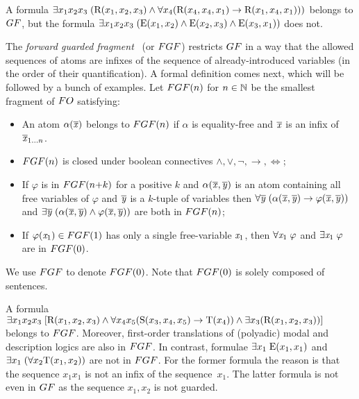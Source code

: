 \begin{example}
A formula $\exists{x_{1}x_{2}x_{3}}\; (\mathrm{R}(x_{1}, x_{2}, x_{3}) \land \forall x_{4}(\mathrm{R}(x_{4}, x_{4}, x_{1}) \to \mathrm{R}(x_{1}, x_{4}, x_{1})))$ belongs to $\GF$, but the formula $\exists{x_{1}x_{2}x_{3}}\; (\mathrm{E}(x_{1}, x_{2}) \land \mathrm{E}(x_{2}, x_{3}) \land \mathrm{E}(x_{3}, x_{1}))$ does not.
\end{example}

The \emph{forward guarded fragment}~\cite[Sec. 3.1]{Bednarczyk21} (or $\FGF$) restricts $\GF$ in a way that the allowed sequences of atoms are infixes of the sequence of already-introduced variables (in the order of their quantification).
A formal definition comes next, which will be followed by a bunch of examples.
Let $\FGF(n)$ for $n \in {\mathbb{N}}$ be the smallest fragment of $\FO$ satisfying:
\begin{itemize}\itemsep0em
    \item An atom $\alpha(\overline{\mathit{x}})$ belongs to $\FGF(n)$ if $\alpha$ is equality-free and $\overline{\mathit{x}}$ is an infix of $\overline{\mathit{x}}_{1\ldots n}$.
    \item $\FGF(n)$ is closed under boolean connectives $\land, \lor, \neg, \to, \iff$;
  \item If $\varphi$ is in $\FGF(n{+}k)$ for a positive $k$ and $\alpha(\overline{\mathit{x}}, \overline{\mathit{y}})$ is an atom containing all free variables of $\varphi$ and $\overline{\mathit{y}}$ is a $k$-tuple of variables then  $\forall{\overline{\mathit{y}}} \; (\alpha(\overline{\mathit{x}}, \overline{\mathit{y}}) \to \varphi(\overline{\mathit{x}}, \overline{\mathit{y}}))$ and $\exists{\overline{\mathit{y}}} \; (\alpha(\overline{\mathit{x}}, \overline{\mathit{y}}) \land \varphi(\overline{\mathit{x}}, \overline{\mathit{y}}))$ are both in $\FGF(n)$;
    \item If $\varphi(\varx_1) \in \FGF(1)$ has only a single free-variable $\mathit{x}_1$, then $\forall{\mathit{x}_1}\; \varphi$ and $\exists{\mathit{x}_1}\; \varphi$ are in $\FGF(0)$.
\end{itemize}
We use $\FGF$ to denote $\FGF(0)$. Note that $\FGF(0)$ is solely composed of sentences. 

\begin{example}
A formula $\exists{x_1x_{2}x_{3}}\; [\mathrm{R}(x_{1}, x_{2}, x_{3}) \land \forall{x_{4}x_{5}}(\mathrm{S}(x_{3}, x_{4}, x_{5}) \to \mathrm{T}(x_{4})) \land \exists{x_{3}}(\mathrm{R}(x_{1}, x_{2}, x_{3}))]$ belongs to $\FGF$.
Moreover, first-order translations of (polyadic) modal and description logics are also in $\FGF$.
In contrast, formulae $\exists{x_{1}}\; \mathrm{E}(x_{1}, x_{1})$ and $\exists{x_{1}}\; (\forall{x_{2}} \mathrm{T}(x_{1}, x_{2}))$ are not in $\FGF$.
For the former formula the reason is that the sequence $x_1x_1$ is not an infix of the sequence~$x_1$.
The latter formula is not even in $\GF$ as the sequence $x_{1}, x_{2}$ is not guarded.
\end{example}

